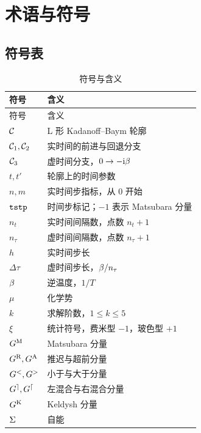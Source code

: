 \chapter{术语与符号}
\label{app:notation}

\section{符号表}
\label{sec:symbols}

\begin{longtable}{@{}p{}p{}@{}}
    \caption[符号与含义]{符号与含义}\label{tab:symbols}\\
    \toprule
    符号 & 含义 \\
    \midrule
    \endfirsthead
    \toprule
    符号 & 含义 \\
    \midrule
    \endhead
    \bottomrule
    \endfoot
    $\mathcal{C}$ & L 形 Kadanoff--Baym 轮廓 \\
    $\mathcal{C}_1,\mathcal{C}_2$ & 实时间的前进与回退分支 \\
    $\mathcal{C}_3$ & 虚时间分支，$0\to-\mathrm{i}\beta$ \\
    $t,t'$ & 轮廓上的时间参数 \\
    $n,m$ & 实时间步指标，从 $0$ 开始 \\
    $\texttt{tstp}$ & 时间步标记；$-1$ 表示 Matsubara 分量 \\
    $n_t$ & 实时间间隔数，点数 $n_t+1$ \\
    $n_\tau$ & 虚时间间隔数，点数 $n_\tau+1$ \\
    $h$ & 实时间步长 \\
    $\Delta\tau$ & 虚时间步长，$\beta/n_\tau$ \\
    $\beta$ & 逆温度，$1/T$ \\
    $\mu$ & 化学势 \\
    $k$ & 求解阶数，$1\le k\le 5$ \\
    $\xi$ & 统计符号，费米型 $-1$，玻色型 $+1$ \\
    $G^{\mathrm{M}}$ & Matsubara 分量 \\
    $G^{\mathrm{R}},G^{\mathrm{A}}$ & 推迟与超前分量 \\
    $G^{<},G^{>}$ & 小于与大于分量 \\
    $G^{\rceil},G^{\lceil}$ & 左混合与右混合分量 \\
    $G^{\mathrm{K}}$ & Keldysh 分量 \\
    $\Sigma$ & 自能 \\

\end{longtable}
